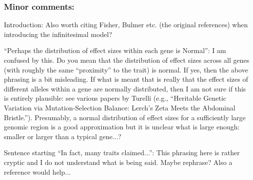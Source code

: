 
\subsubsection*{Minor comments:}

\begin{point}{}
    Introduction: Also worth citing Fisher, Bulmer etc. (the original references) when introducing the infinitesimal model?
\end{point}


\begin{point}{\revref}
    ``Perhaps the distribution of effect sizes within each gene is Normal'': I am confused by this. Do you mean that the distribution of effect sizes across all genes (with roughly the same ``proximity'' to the trait) is normal. If yes, then the above phrasing is a bit misleading. If what is meant that is really that the effect sizes of different alleles within a gene are normally distributed, then I am not sure if this is entirely plausible: see various papers by Turelli (e.g., ``Heritable Genetic Variation via Mutation-Selection Balance: Lerch's Zeta Meets the Abdominal Bristle.''). Presumably, a normal distribution of effect sizes for a sufficiently large genomic region is a good approximation but it is unclear what is large enough: smaller or larger than a typical gene...?
\end{point}


\begin{point}{\revref}
    Sentence starting ``In fact, many traits claimed...'': This phrasing here is rather cryptic and I do not understand what is being said. Maybe rephrase? Also a reference would help...
\end{point}

